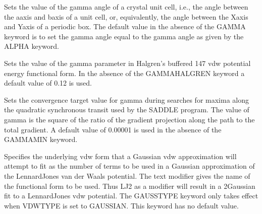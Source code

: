 \documentclass[letterpaper,11pt,english]{sphinxmanual}
\begin{document}
\ignorespaces {}\label{\detokenize{text/keywords:key-gamma}}\begin{description}
\sphinxAtStartPar
Sets the value of the gamma angle of a crystal unit cell, i.e., the angle between the a\sphinxhyphen{}axis and b\sphinxhyphen{}axis of a unit cell, or, equivalently, the angle between the X\sphinxhyphen{}axis and Y\sphinxhyphen{}axis of a periodic box. The default value in the absence of the GAMMA keyword is to set the gamma angle equal to the gamma angle as given by the ALPHA keyword.

\end{description}

\ignorespaces {}\label{\detokenize{text/keywords:key-gamma-halgren}}\begin{description}
\sphinxAtStartPar
Sets the value of the gamma parameter in Halgren’s buffered 14\sphinxhyphen{}7 vdw potential energy functional form. In the absence of the GAMMA\sphinxhyphen{}HALGREN keyword a default value of 0.12 is used.

\end{description}

\ignorespaces {}\label{\detokenize{text/keywords:key-gammamin}}\begin{description}
\sphinxAtStartPar
Sets the convergence target value for gamma during searches for maxima along the quadratic synchronous transit used by the SADDLE program. The value of gamma is the square of the ratio of the gradient projection along the path to the total gradient. A default value of 0.00001 is used in the absence of the GAMMAMIN keyword.

\end{description}

\ignorespaces {}\label{\detokenize{text/keywords:key-gausstype}}\begin{description}
\sphinxAtStartPar
Specifies the underlying vdw form that a Gaussian vdw approximation will attempt to fit as the number of terms to be used in a Gaussian approximation of the Lennard\sphinxhyphen{}Jones van der Waals potential. The text modifier gives the name of the functional form to be used. Thus LJ\sphinxhyphen{}2 as a modifier will result in a 2\sphinxhyphen{}Gaussian fit to a Lennard\sphinxhyphen{}Jones vdw potential. The GAUSSTYPE keyword only takes effect when VDWTYPE is set to GAUSSIAN. This keyword has no default value.

\end{description}
\end{document}
